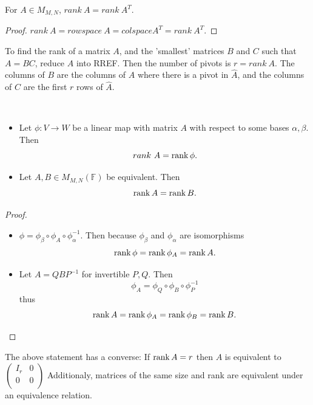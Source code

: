 \begin{corollary}
  For $A \in M_{M, N}$, $rank \ A = rank \ A^T$.
\end{corollary}
\begin{proof}
    $rank \ A = rowspace \ A = colspace A^T = rank \ A^T$.
\end{proof}

\begin{remark}
    To find the rank of a matrix $A$, and the 'smallest' matrices $B$ and $C$ such that $A = BC$, reduce $A$ into RREF. Then the number of pivots is $r = rank \ A$. The columns of $B$ are the columns of $A$ where there is a pivot in $\hat{A}$, and the columns of $C$ are the first $r$ rows of $\hat{A}$.
\end{remark}

\begin{prop} $ $
  \begin{itemize}
    \item Let $\phi : V \rightarrow W$ be a linear map with matrix $A$ with respect to some bases $\alpha, \beta$. Then
      \[rank \ A =\operatorname{rank} \phi.\]
    \item Let $A, B \in M_{M,N}(\mathbb{F})$ be equivalent. Then 
      \[\operatorname{rank} A = \operatorname{rank} B.\]
  \end{itemize}
\end{prop}
\begin{proof} $ $
  \begin{itemize}
    \item $\phi = \phi_\beta \circ \phi_A \circ \phi_\alpha^{-1}$. Then because $\phi_\beta$ and $\phi_\alpha$ are isomorphisms
      \[\operatorname{rank} \phi = \operatorname{rank} \phi_A = \operatorname{rank} A.\]
    \item Let $A = QBP^{-1}$ for invertible $P, Q$. Then
      \[\phi_A = \phi_Q \circ \phi_B \circ \phi_P^{-1}\]
      thus
      \[\operatorname{rank} A = \operatorname{rank} \phi_A = \operatorname{rank} \phi_B = \operatorname{rank} B.\]
  \end{itemize}
\end{proof}

\begin{remark}
    The above statement has a converse: If $\operatorname{rank} A = r$ then
    $A$ is equivalent to $\begin{pmatrix}
    I_r & 0\\
    0 & 0\\
    \end{pmatrix}$  Additionaly, matrices of the same size and rank are equivalent under an equivalence relation.
\end{remark}

